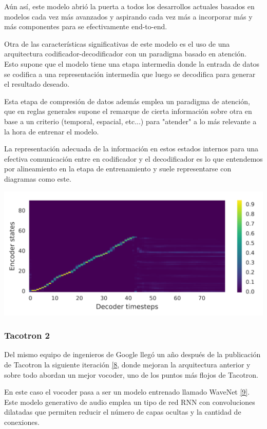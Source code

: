 Aún así, este modelo abrió la puerta a todos los desarrollos actuales basados en modelos cada vez más avanzados y aspirando cada vez más a incorporar más y más componentes para se efectivamente end-to-end.

Otra de las características significativas de este modelo es el uso de una arquitectura codificador-decodificador con un paradigma basado en atención. Esto supone que el modelo tiene una etapa intermedia donde la entrada de datos se codifica a una representación intermedia que luego se decodifica para generar el resultado deseado.

Esta etapa de compresión de datos además emplea un paradigma de atención, que en reglas generales supone el remarque de cierta información sobre otra en base a un criterio (temporal, espacial, etc...) para "atender" a lo más relevante a la hora de entrenar el modelo.

La representación adecuada de la información en estos estados internos para una efectiva comunicación entre en codificador y el decodificador es lo que entendemos por alineamiento en la etapa de entrenamiento y suele representarse con diagramas como este.

\begin{center}
\includegraphics[width=14cm]{4_estado_del_arte_img/tacotron_1.png}
\end{center}

\subsubsection{Tacotron 2}

Del mismo equipo de ingenieros de Google llegó un año después de la publicación de Tacotron la siguiente iteración \hyperref[EA_6]{[8}, donde mejoran la arquitectura anterior y sobre todo abordan un mejor vocoder, uno de los puntos más flojos de Tacotron.

En este caso el vocoder pasa a ser un modelo entrenado llamado WaveNet  \hyperref[EA_7]{[9]}. Este modelo generativo de audio emplea un tipo de red RNN con convoluciones dilatadas que permiten reducir el número de capas ocultas y la cantidad de conexiones.

